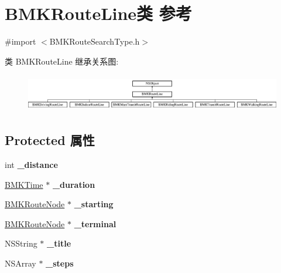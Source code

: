 \hypertarget{interface_b_m_k_route_line}{}\section{B\+M\+K\+Route\+Line类 参考}
\label{interface_b_m_k_route_line}


{\ttfamily \#import $<$B\+M\+K\+Route\+Search\+Type.\+h$>$}

类 B\+M\+K\+Route\+Line 继承关系图\+:\begin{figure}[H]
\begin{center}
\leavevmode
\includegraphics[height=1.637427cm]{interface_b_m_k_route_line}
\end{center}
\end{figure}
\subsection*{Protected 属性}
\begin{DoxyCompactItemize}
\item 
\hypertarget{interface_b_m_k_route_line_ab4bc6b811527065bb19e0c8d1af822ee}{}int {\bfseries \+\_\+distance}\label{interface_b_m_k_route_line_ab4bc6b811527065bb19e0c8d1af822ee}

\item 
\hypertarget{interface_b_m_k_route_line_ab856ba5b78a2bb4d3625c0cf74b1e427}{}\hyperlink{interface_b_m_k_time}{B\+M\+K\+Time} $\ast$ {\bfseries \+\_\+duration}\label{interface_b_m_k_route_line_ab856ba5b78a2bb4d3625c0cf74b1e427}

\item 
\hypertarget{interface_b_m_k_route_line_adbeb7549910a94f1b6513b124808d57f}{}\hyperlink{interface_b_m_k_route_node}{B\+M\+K\+Route\+Node} $\ast$ {\bfseries \+\_\+starting}\label{interface_b_m_k_route_line_adbeb7549910a94f1b6513b124808d57f}

\item 
\hypertarget{interface_b_m_k_route_line_a42ee9b3affc42d0a25c52fa0dc2d4a8f}{}\hyperlink{interface_b_m_k_route_node}{B\+M\+K\+Route\+Node} $\ast$ {\bfseries \+\_\+terminal}\label{interface_b_m_k_route_line_a42ee9b3affc42d0a25c52fa0dc2d4a8f}

\item 
\hypertarget{interface_b_m_k_route_line_a862b967d37cfd210ba72dcaa6bad75b1}{}N\+S\+String $\ast$ {\bfseries \+\_\+title}\label{interface_b_m_k_route_line_a862b967d37cfd210ba72dcaa6bad75b1}

\item 
\hypertarget{interface_b_m_k_route_line_ad573249944bdb333411aa9ea588b3eb0}{}N\+S\+Array $\ast$ {\bfseries \+\_\+steps}\label{interface_b_m_k_route_line_ad573249944bdb333411aa9ea588b3eb0}

\end{DoxyCompactItemize}
